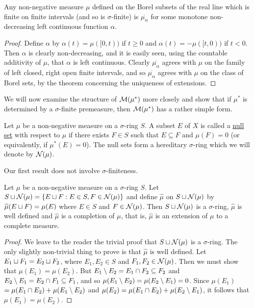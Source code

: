 \begin{corollary}
Any non-negative measure $\mu$ defined on the Borel subsets of the real line which is finite on finite intervals (and so is $\sigma$-finite) is $\overline{\mu_\alpha}$ for some monotone non-decreasing left continuous function $\alpha$.
\end{corollary}

\begin{proof}
Define $\alpha$ by $\alpha(t)=\mu([0, t))$ if $t \geq 0$ and $\alpha(t)=-\mu([t, 0))$ if $t<0$. Then $\alpha$ is clearly non-decreasing, and it is easily seen, using the countable additivity of $\mu$, that $\alpha$ is left continuous. Clearly $\overline{\mu_\alpha}$ agrees with $\mu$ on the family of left closed, right open finite intervals, and so $\overline{\mu_\alpha}$ agrees with $\mu$ on the class of Borel sets, by the theorem concerning the uniqueness of extensions.
\end{proof}

We will now examine the structure of ${\cal M}(\mu^*)$ more closely and show that if $\mu^*$ is determined by a $\sigma$-finite premeasure, then ${\cal M}(\mu^*)$ has a rather simple form.

\begin{definition}
Let $\mu$ be a non-negative measure on a $\sigma$-ring $S$. A subset $E$ of $X$ is called a \underline{null set} with respect to $\mu$ if there exists $F \in S$ such that $E \subseteq F$ and $\mu(F)=0$ (or equivalently, if $\mu^*(E)=0$). The null sets form a hereditary $\sigma$-ring which we will denote by ${\cal N}(\mu)$.
\end{definition}

Our first result does not involve $\sigma$-finiteness.

\begin{proposition}
\label{prop:null set completion}
Let $\mu$ be a non-negative measure on a $\sigma$-ring $S$. Let $S\sqcup{\cal N}(\mu)=\{E\sqcup F:E\in S,F\in {\cal N}(\mu)\}$ and define $\widehat{\mu}$ on $S \sqcup {\cal N}(\mu)$ by $\widehat{\mu}(E \sqcup F)=\mu(E)$ where $E \in S$ and $F \in {\cal N}(\mu)$. Then $S \sqcup {\cal N}(\mu)$ is a $\sigma$-ring, $\widehat{\mu}$ is well defined and $\widehat{\mu}$ is a completion of $\mu$, that is, $\widehat{\mu}$ is an extension of $\mu$ to a complete measure.
\end{proposition}

\begin{proof}
We leave to the reader the trivial proof that $S\sqcup {\cal N}(\mu)$ is a $\sigma$-ring. The only slightly non-trivial thing to prove is that $\widehat{\mu}$ is well defined. Let $E_1 \sqcup F_1=E_2 \sqcup F_2$, where $E_1, E_2 \in S$ and $F_1, F_2 \in {\cal N}(\mu)$. Then we must show that $\mu(E_1)=\mu(E_2)$. But $E_1\setminus E_2=E_1 \cap F_2 \subseteq F_2$ and $E_2\setminus E_1=E_2 \cap F_1 \subseteq F_1$, and so $\mu(E_1\setminus E_2)=\mu(E_2\setminus E_1)=0$. Since $\mu(E_1)$ $=\mu(E_1 \cap E_2)+\mu(E_1\setminus E_2)$ and $\mu(E_2)=\mu(E_1 \cap E_2)+\mu(E_2\setminus E_1)$, it follows that $\mu(E_1)=\mu(E_2)$.

\end{proof}

